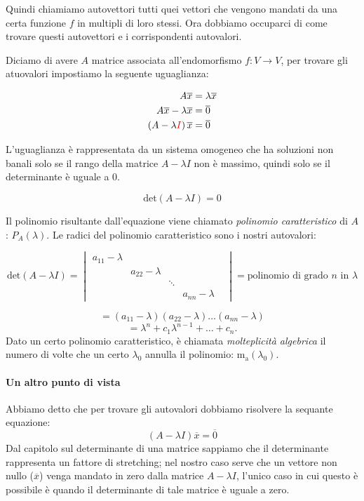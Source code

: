 \documentclass[x11names]{article}
\begin{document}
Quindi chiamiamo autovettori tutti quei vettori che vengono mandati da una certa funzione $f$ in multipli di loro stessi. Ora dobbiamo occuparci di come trovare questi autovettori e i corrispondenti autovalori. 

\noindent
Diciamo di avere $A$ matrice associata all'endomorfismo  $f:V \rightarrow V$, per trovare gli atuovalori impostiamo la seguente uguaglianza: 

\begin{align*}
A\overline{x} &= \lambda \overline{x} \\
A\overline{x} - \lambda \overline{x} &= \overline{0}\\
\left(A - \lambda \textcolor{red}{I}\right)\overline{x} &= \overline{0} 
\end{align*}

L'uguaglianza è rappresentata da un sistema omogeneo che ha soluzioni non banali solo se il rango della matrice $A-\lambda I$ non è massimo, quindi solo se il determinante è uguale a $0$.

\[
\text{det}\left(A - \lambda I\right) = 0
\] 

\noindent
Il polinomio risultante dall'equazione viene chiamato \textit{polinomio caratteristico} di $A$:  $P_{A}\left(\lambda\right)$. Le radici del polinomio caratteristico sono i nostri autovalori:

 \[
\text{det}\left(A-\lambda I\right) = \begin{vmatrix}
     a_{11}-\lambda &  &  & \\
     & a_{22}-\lambda &  & \\
     &  & \ddots&  & \\
     & &  & a_{nn}-\lambda 
\end{vmatrix}
= \text{polinomio di grado }n \text{ in } \lambda
\] 

\[
= \left(a_{11} - \lambda\right)\left(a_{22}-\lambda\right)\dots\left(a_{nn}-\lambda\right)
\] 
\[
= \lambda^n + c_{1}\lambda^{n-1} + \dots + c_{n} 
.\] 
\noindent
Dato un certo polinomio caratteristico, è chiamata \textit{molteplicità algebrica} il numero di volte che un certo $\lambda_{0}$ annulla il polinomio: $\text{m}_{\text{a}}\left(\lambda_{0}\right)$.

\paragraph{Un altro punto di vista} Abbiamo detto che per trovare gli autovalori dobbiamo risolvere la sequante equazione:
\[
	\left(A - \lambda I \right)\overline{x} = \overline{0}
\] 
Dal capitolo sul determinante di una matrice sappiamo che il determinante rappresenta un fattore di stretching; nel nostro caso serve che un vettore non nullo ($\overline{x}$) venga mandato in zero dalla matrice $A - \lambda I$, l'unico caso in cui questo è possibile è quando il determinante di tale matrice è uguale a zero.
\end{document}
